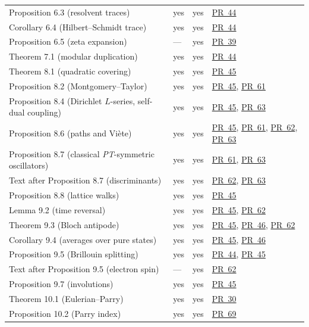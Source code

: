 \documentclass[11pt,a4paper]{article}
\newcommand{\R}{https://github.com/ralfanop/Certifications_Eulerian_polar-curve_computations}
\newcommand{\PR}[1]{\href{\R/pull/#1}{PR~#1}}
\begin{document}
{\begin{longtable}{@{}>{\raggedright\arraybackslash}p{}>{\raggedright\arraybackslash}p{}>{\raggedright\arraybackslash}p{}>{\raggedright\arraybackslash}p{}@{}}
Proposition 6.3 (resolvent traces) & yes & yes & \PR{44}\\
Corollary 6.4 (Hilbert--Schmidt trace) & yes & yes & \PR{44}\\
Proposition 6.5 (zeta expansion) & --- & yes & \PR{39}\\
Theorem 7.1 (modular duplication) & yes & yes & \PR{44}\\
Theorem 8.1 (quadratic covering) & yes & yes & \PR{45}\\
Proposition 8.2 (Montgomery--Taylor) & yes & yes & \PR{45}, \PR{61}\\
Proposition 8.4 (Dirichlet $L$-series, self-dual coupling) & yes & yes & \PR{45}, \PR{63}\\
Proposition 8.6 (paths and Vi\`ete) & yes & yes & \PR{45}, \PR{61}, \PR{62}, \PR{63}\\
Proposition 8.7 (classical \textit{PT}-symmetric oscillators) & yes & yes & \PR{61}, \PR{63}\\
Text after Proposition 8.7 (discriminants) & yes & yes & \PR{62}, \PR{63}\\
Proposition 8.8 (lattice walks) & yes & yes & \PR{45}\\
Lemma 9.2 (time reversal) & yes & yes & \PR{45}, \PR{62}\\
Theorem 9.3 (Bloch antipode) & yes & yes & \PR{45}, \PR{46}, \PR{62}\\
Corollary 9.4 (averages over pure states) & yes & yes & \PR{45}, \PR{46}\\
Proposition 9.5 (Brillouin splitting) & yes & yes & \PR{44}, \PR{45}\\
Text after Proposition 9.5 (electron spin) & --- & yes & \PR{62}\\
Proposition 9.7 (involutions) & yes & yes & \PR{45}\\
Theorem 10.1 (Eulerian--Parry) & yes & yes & \PR{30}\\
Proposition 10.2 (Parry index) & yes & yes & \PR{69}\\
\end{longtable}
}
\end{document}
